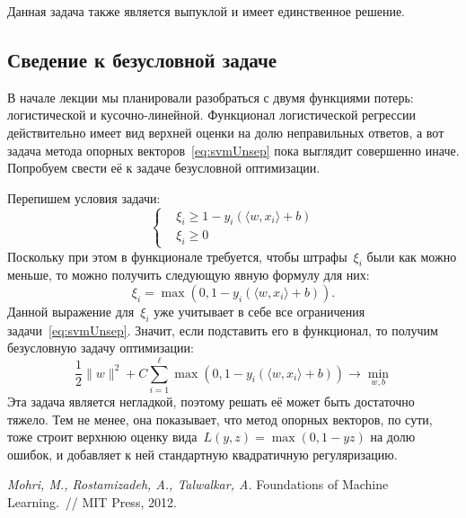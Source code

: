 \documentclass[12pt,fleqn]{article}
\begin{document}
Данная задача также является выпуклой и имеет единственное решение.

\subsection{Сведение к безусловной задаче}
В начале лекции мы планировали разобраться с двумя функциями потерь: логистической и кусочно-линейной.
Функционал логистической регрессии действительно имеет вид верхней оценки на долю неправильных ответов,
а вот задача метода опорных векторов~\eqref{eq:svmUnsep} пока выглядит совершенно иначе.
Попробуем свести её к задаче безусловной оптимизации.

Перепишем условия задачи:
\[
    \left\{
    \begin{aligned}
        &\xi_i \geq 1 - y_i (\langle w, x_i \rangle + b) \\
        &\xi_i \geq 0
    \end{aligned}
    \right.
\]
Поскольку при этом в функционале требуется, чтобы штрафы~$\xi_i$ были как можно меньше,
то можно получить следующую явную формулу для них:
\[
    \xi_i
    =
    \max(0,
        1 - y_i (\langle w, x_i \rangle + b)).
\]
Данной выражение для~$\xi_i$ уже учитывает в себе все ограничения задачи~\eqref{eq:svmUnsep}.
Значит, если подставить его в функционал, то получим безусловную задачу оптимизации:
\[
    \frac{1}{2} \|w\|^2
    +
    C
    \sum_{i = 1}^{\ell}
        \max(0,
            1 - y_i (\langle w, x_i \rangle + b))
    \to
    \min_{w, b}
\]
Эта задача является негладкой, поэтому решать её может быть достаточно тяжело.
Тем не менее, она показывает, что метод опорных векторов, по сути,
тоже строит верхнюю оценку вида~$L(y, z) = \max(0, 1 - yz)$ на долю ошибок,
и добавляет к ней стандартную квадратичную регуляризацию.


\begin{thebibliography}{1}
    \emph{Mohri, M., Rostamizadeh, A., Talwalkar, A.}
    Foundations of Machine Learning.~// MIT Press, 2012.
\end{thebibliography}
\end{document}
